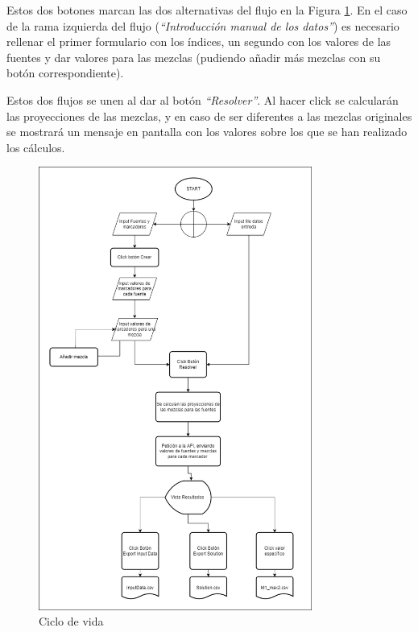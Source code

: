 Estos dos botones marcan las dos alternativas del flujo en la Figura \ref{fig:cicloDeVida}. En el caso de la rama izquierda del flujo  (\textit{``Introducción manual de los datos''}) es necesario rellenar el primer formulario con los índices, un segundo con los valores de las fuentes y dar valores para las mezclas (pudiendo añadir más mezclas con su botón correspondiente).

Estos dos flujos se unen al dar al botón \textit{``Resolver''}. Al hacer click se calcularán las proyecciones de las mezclas, y en caso de ser diferentes a las mezclas originales se mostrará un mensaje en pantalla con los valores sobre los que se han realizado los cálculos. 



\begin{figure}[h!] 
\centering
    \includegraphics[width=0.8\textwidth]{img/cicloDeVida.png}
\caption{Ciclo de vida }
\label{fig:cicloDeVida}
\end{figure}

